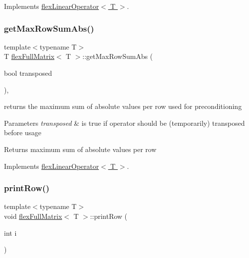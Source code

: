 Implements \hyperlink{classflex_linear_operator_a0a0a431d43f4f9d36cbee0d31ba5a29b}{flex\+Linear\+Operator$<$ T $>$}.

\mbox{\label{classflex_full_matrix_a3ca8466b330c14b23689cb9f5507d40a}} 
\subsubsection{\texorpdfstring{get\+Max\+Row\+Sum\+Abs()}{getMaxRowSumAbs()}}
{\footnotesize\ttfamily template$<$typename T$>$ \\
T \hyperlink{classflex_full_matrix}{flex\+Full\+Matrix}$<$ T $>$\+::get\+Max\+Row\+Sum\+Abs (\begin{DoxyParamCaption}\item[{bool}]{transposed }\end{DoxyParamCaption})\hspace{0.3cm}{\ttfamily [inline]}, {\ttfamily [virtual]}}



returns the maximum sum of absolute values per row used for preconditioning 


\begin{DoxyParams}{Parameters}
{\em transposed} & is true if operator should be (temporarily) transposed before usage \\
\hline
\end{DoxyParams}
\begin{DoxyReturn}{Returns}
maximum sum of absolute values per row 
\end{DoxyReturn}


Implements \hyperlink{classflex_linear_operator_afcb74697385ccb7c8d29870d7034c12a}{flex\+Linear\+Operator$<$ T $>$}.

\mbox{\label{classflex_full_matrix_a0b9340f3b7a7559c56db7d1ce0d9d510}} 
\subsubsection{\texorpdfstring{print\+Row()}{printRow()}}
{\footnotesize\ttfamily template$<$typename T$>$ \\
void \hyperlink{classflex_full_matrix}{flex\+Full\+Matrix}$<$ T $>$\+::print\+Row (\begin{DoxyParamCaption}\item[{int}]{i }\end{DoxyParamCaption})\hspace{0.3cm}{\ttfamily [inline]}}



